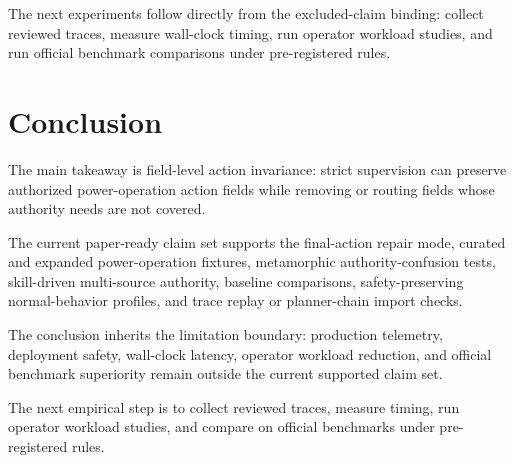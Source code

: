 \documentclass[11pt]{article}
\begin{document}
The next experiments follow directly from the excluded-claim binding: collect reviewed traces, measure wall-clock timing, run operator workload studies, and run official benchmark comparisons under pre-registered rules.

\section{Conclusion}

The main takeaway is field-level action invariance: strict supervision can preserve authorized power-operation action fields while removing or routing fields whose authority needs are not covered.

The current paper-ready claim set supports the final-action repair mode, curated and expanded power-operation fixtures, metamorphic authority-confusion tests, skill-driven multi-source authority, baseline comparisons, safety-preserving normal-behavior profiles, and trace replay or planner-chain import checks.

The conclusion inherits the limitation boundary: production telemetry, deployment safety, wall-clock latency, operator workload reduction, and official benchmark superiority remain outside the current supported claim set.

The next empirical step is to collect reviewed traces, measure timing, run operator workload studies, and compare on official benchmarks under pre-registered rules.
\end{document}
